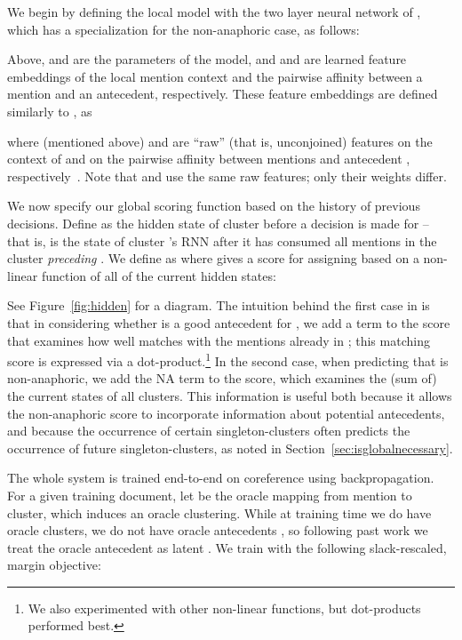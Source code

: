 \documentclass[11pt,letterpaper]{article}
\begin{document}
\vspace{-3mm}
\noindent We begin by defining the local model  with the two layer neural network of , which has a specialization for the non-anaphoric case, as follows:    

\vspace{-1mm}
{\small 

}

\vspace{-2mm}
\noindent Above,  and  are the parameters of the model, and  and  are learned feature embeddings of the local mention context and the pairwise affinity between a mention and an antecedent, respectively. These feature embeddings are defined similarly to , as
\vspace{-1mm}
{\small

}

\vspace{-5mm}
\noindent where  (mentioned above) and  are ``raw'' (that is, unconjoined) features on the context of  and on the pairwise affinity between mentions  and antecedent , respectively~\cite{wiseman15learning}. Note that  and  use the same raw features; only their weights differ.

We now specify our global scoring function  based on the history of 
previous decisions. Define  as the hidden state 
of cluster  before a decision is made for  -- that is,  is the state of cluster 's RNN after it has consumed all mentions in the cluster \textit{preceding} .
We define  as 
{\small}where  gives a score for assigning  based on 
a non-linear function of all of the current hidden states:

{\small}See Figure~\ref{fig:hidden} for a diagram. The intuition behind the first case in  is that in considering whether  is a good antecedent for , we add a term to the score that examines how well  matches with the mentions already in ; this matching score is expressed via a dot-product.\footnote{We also experimented with other non-linear functions, but dot-products performed best.} In the second case, when predicting that  is non-anaphoric, we add the NA term to the score, which examines the (sum of) the current states  of all clusters. This information is useful both because it allows the non-anaphoric score to incorporate information about potential antecedents, and because the occurrence of certain singleton-clusters often predicts the occurrence of future singleton-clusters, as noted in Section~\ref{sec:isglobalnecessary}.

The whole system is trained end-to-end on coreference using
backpropagation. For a given training document, let 
be the oracle mapping from mention to cluster, which induces an oracle
clustering.
While at training time we do have oracle clusters, we do not have oracle antecedents , so 
following past work we treat the oracle antecedent as latent \cite{yu2009learning,fernandes2012latent,Chang:13,DandK:13}.
We train with the following slack-rescaled, margin objective:
\end{document}
